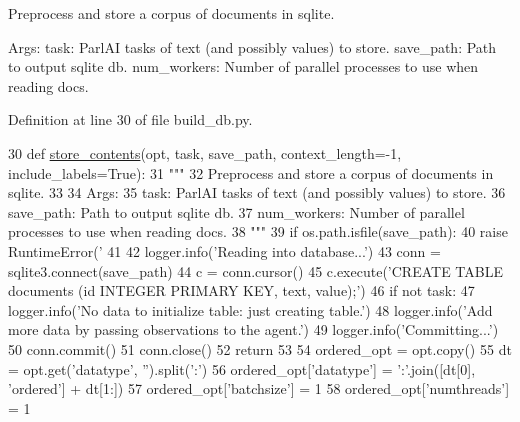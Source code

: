 \begin{DoxyVerb}Preprocess and store a corpus of documents in sqlite.

Args:
    task: ParlAI tasks of text (and possibly values) to store.
    save_path: Path to output sqlite db.
    num_workers: Number of parallel processes to use when reading docs.
\end{DoxyVerb}
 

Definition at line 30 of file build\+\_\+db.\+py.


\begin{DoxyCode}
30 \textcolor{keyword}{def }\hyperlink{namespaceparlai_1_1agents_1_1tfidf__retriever_1_1build__db_a794fe63c76c7ac42ca1ac1b18c2528f4}{store\_contents}(opt, task, save\_path, context\_length=-1, include\_labels=True):
31     \textcolor{stringliteral}{"""}
32 \textcolor{stringliteral}{    Preprocess and store a corpus of documents in sqlite.}
33 \textcolor{stringliteral}{}
34 \textcolor{stringliteral}{    Args:}
35 \textcolor{stringliteral}{        task: ParlAI tasks of text (and possibly values) to store.}
36 \textcolor{stringliteral}{        save\_path: Path to output sqlite db.}
37 \textcolor{stringliteral}{        num\_workers: Number of parallel processes to use when reading docs.}
38 \textcolor{stringliteral}{    """}
39     \textcolor{keywordflow}{if} os.path.isfile(save\_path):
40         \textcolor{keywordflow}{raise} RuntimeError(\textcolor{stringliteral}{'%
41 
42     logger.info(\textcolor{stringliteral}{'Reading into database...'})
43     conn = sqlite3.connect(save\_path)
44     c = conn.cursor()
45     c.execute(\textcolor{stringliteral}{'CREATE TABLE documents (id INTEGER PRIMARY KEY, text, value);'})
46     \textcolor{keywordflow}{if} \textcolor{keywordflow}{not} task:
47         logger.info(\textcolor{stringliteral}{'No data to initialize table: just creating table.'})
48         logger.info(\textcolor{stringliteral}{'Add more data by passing observations to the agent.'})
49         logger.info(\textcolor{stringliteral}{'Committing...'})
50         conn.commit()
51         conn.close()
52         \textcolor{keywordflow}{return}
53 
54     ordered\_opt = opt.copy()
55     dt = opt.get(\textcolor{stringliteral}{'datatype'}, \textcolor{stringliteral}{''}).split(\textcolor{stringliteral}{':'})
56     ordered\_opt[\textcolor{stringliteral}{'datatype'}] = \textcolor{stringliteral}{':'}.join([dt[0], \textcolor{stringliteral}{'ordered'}] + dt[1:])
57     ordered\_opt[\textcolor{stringliteral}{'batchsize'}] = 1
58     ordered\_opt[\textcolor{stringliteral}{'numthreads'}] = 1
}
\end{DoxyCode}
